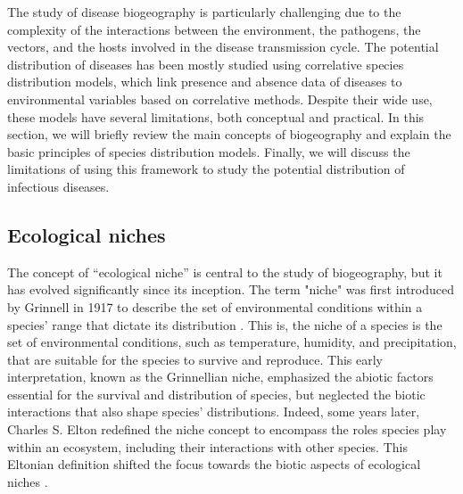 The study of disease biogeography is particularly challenging due to the
complexity of the interactions between the environment, the pathogens, the
vectors, and the hosts involved in the disease transmission cycle. The
potential distribution of diseases has been mostly studied using correlative
species distribution models, which link presence and absence data of diseases
to environmental variables based on correlative methods. Despite their wide
use, these models have several limitations, both conceptual and practical. In
this section, we will briefly review the main concepts of biogeography and
explain the basic principles of species distribution models. Finally, we will
discuss the limitations of using this framework to study the potential
distribution of infectious diseases.

\subsection{\label{sec:Ecological niches} Ecological niches}

The concept of ``ecological niche'' is central to the study of biogeography,
but it has evolved significantly since its inception. The term "niche" was
first introduced by Grinnell in 1917 to describe the set of environmental
conditions within a species' range that dictate its distribution
\cite{Grinnell1917}. This is, the niche of a species is the set of
environmental conditions, such as temperature, humidity, and precipitation,
that are suitable for the species to survive and reproduce. This early
interpretation, known as the Grinnellian niche, emphasized the abiotic
factors essential for the survival and distribution of species, but neglected
the biotic interactions that also shape species' distributions. Indeed, some
years later, Charles S. Elton redefined the niche concept to encompass the
roles
species play within an ecosystem, including their interactions with other
species. This Eltonian definition shifted the focus towards the biotic
aspects of ecological niches \cite{Elton1927}.

